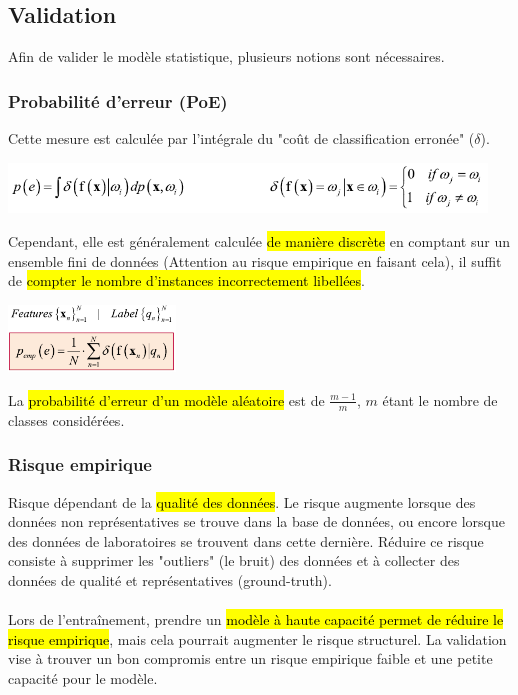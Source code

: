 \documentclass[letterpaper, 12pt]{article}
\newcommand{\alinea}{
\hspace*{0.5cm}}
\begin{document}
		\subsection{Validation}
			\alinea Afin de valider le modèle statistique, plusieurs notions sont nécessaires.
			\subsubsection{Probabilité d'erreur (PoE)}
				\alinea Cette mesure est calculée par l'intégrale du "coût de classification erronée" ($\delta$).
					\begin{center}
						\includegraphics[width=5in]{Images/PoE} 
					\end{center}
				Cependant, elle est généralement calculée \hl{de manière discrète} en comptant sur un ensemble fini de données
				(Attention au risque empirique en faisant cela), il suffit de \hl{compter le nombre d'instances incorrectement 
				libellées}.
					\begin{center}
						\includegraphics[width=1.75in]{Images/PoE2} 
					\end{center}
				La \hl{probabilité d'erreur d'un modèle aléatoire} est de $\frac{m-1}{m}$, $m$ étant le nombre de classes considérées.
			\subsubsection{Risque empirique}
				\alinea Risque dépendant de la \hl{qualité des données}. Le risque augmente lorsque des données non représentatives 
					se trouve dans la base de données, ou encore lorsque des données de laboratoires se trouvent dans cette dernière.
					Réduire ce risque consiste à supprimer les "outliers" (le bruit) des données et à collecter des données de qualité
					et représentatives (ground-truth).\\
				~\\
				\alinea Lors de l'entraînement, prendre un \hl{modèle à haute capacité permet de réduire le risque empirique},
					mais cela pourrait augmenter le risque structurel. La validation vise à trouver un bon compromis entre un 
					risque empirique faible et une petite capacité pour le modèle.
\end{document}
